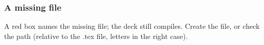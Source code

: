 \documentclass[aspectratio=169,10pt,compress]{beamer}
\begin{document}
\label{sec:notes}




\begin{frame}[t,fragile] \frametitle{A missing file}

\begin{texcode}
\end{texcode}


	\small A red box names the missing file; the deck still compiles.
	Create the file, or check the path (relative to the .tex file, letters in the right case).
\end{frame}
\end{document}

